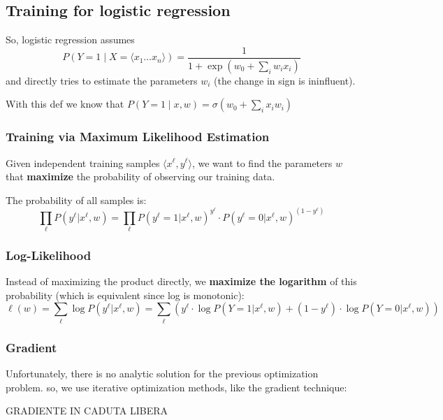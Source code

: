 \subsection{Training for logistic regression}
So, logistic regression assumes
\[
 P(Y=1\mid X =\langle x_1 \dots x_n\rangle) =\frac{1}{1+\exp{(w_0+\sum_iw_ix_i)}}
\]
and directly tries to estimate the parameters $w_i$ (the change in sign
is ininfluent).


With this def we know that $P(Y=1\mid x, w) = \sigma (w_0 + \sum_{i}x_iw_i)$

\subsubsection{Training via Maximum Likelihood Estimation}

Given independent training samples $\langle x^\ell, y^\ell \rangle$, we want to find the parameters $w$ that \textbf{maximize} the probability of observing our training data.

The probability of all samples is:
\[
\prod_\ell P(y^\ell | x^\ell, w) = \prod_\ell P(y^\ell = 1|x^\ell, w)^{y^\ell} \cdot P(y^\ell = 0|x^\ell, w)^{(1-y^\ell)}
\]


\subsubsection{Log-Likelihood}

Instead of maximizing the product directly, we \textbf{maximize the logarithm} of this probability (which is equivalent since log is monotonic):
\[
\ell(w) = \sum_\ell \log P(y^\ell | x^\ell, w) = \sum_\ell \left( y^\ell \cdot \log P(Y=1|x^\ell, w) + (1-y^\ell) \cdot \log P(Y=0|x^\ell, w) \right)
\]

\subsubsection{Gradient}

Unfortunately, there is no analytic solution for the previous
optimization problem.
so, we use iterative optimization methods, like the gradient
technique:

GRADIENTE IN CADUTA LIBERA

% 
